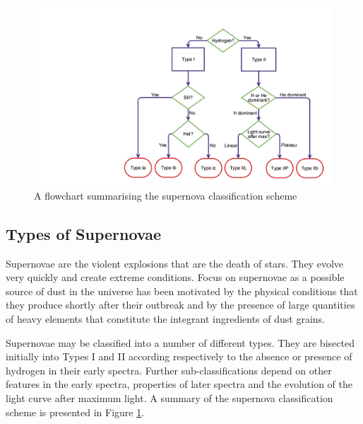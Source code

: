 \begin{figure}
\centering
\includegraphics[clip=true, scale = 0.2, trim= 930 50 55 210]{chapters/chapter1/figs/sn_classification.png}
\caption{A flowchart summarising the supernova classification scheme}
\label{intro:fig:sn_class}
\end{figure}

\subsection{Types of Supernovae}

Supernovae are the violent explosions that are the death of stars.  They evolve very quickly and create extreme conditions.  Focus on supernovae as a possible source of dust in the universe has been motivated by the physical conditions that they produce shortly after their outbreak and by the presence of large quantities of heavy elements that constitute the integrant ingredients of dust grains.

Supernovae may be classified into a number of different types.  They are bisected initially into Types I and II according respectively to the absence or presence of hydrogen in their early spectra.  Further sub-classifications depend on  other features in the early spectra, properties of later spectra and the evolution of the  light curve after maximum light.  A summary of the supernova classification scheme is presented in Figure \ref{intro:fig:sn_class}.  



